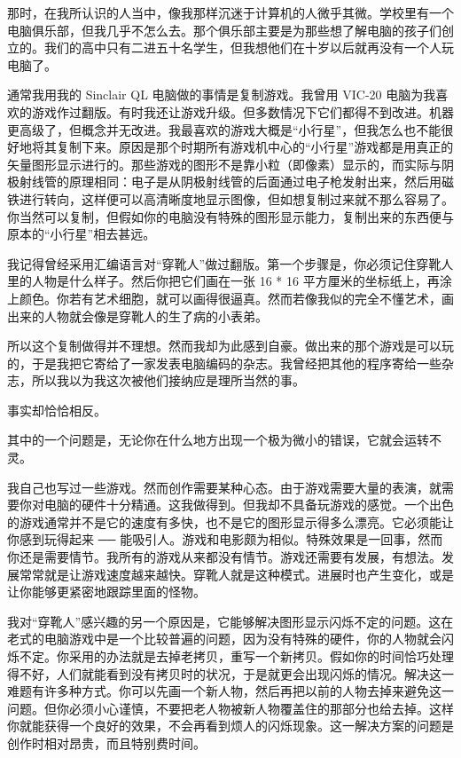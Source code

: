 那时，在我所认识的人当中，像我那样沉迷于计算机的人微乎其微。学校里有一个电脑俱乐部，但我几乎不怎么去。那个俱乐部主要是为那些想了解电脑的孩子们创立的。我们的高中只有二进五十名学生，但我想他们在十岁以后就再没有一个人玩电脑了。

通常我用我的 Sinclair QL 电脑做的事情是复制游戏。我曾用 VIC-20 电脑为我喜欢的游戏作过翻版。有时我还让游戏升级。但多数情况下它们都得不到改进。机器更高级了，但概念并无改进。我最喜欢的游戏大概是“小行星”，但我怎么也不能很好地将其复制下来。原因是那个时期所有游戏机中心的“小行星”游戏都是用真正的矢量图形显示进行的。那些游戏的图形不是靠小粒（即像素）显示的，而实际与阴极射线管的原理相同：电子是从阴极射线管的后面通过电子枪发射出来，然后用磁铁进行转向，这样便可以高清晰度地显示图像，但如想复制过来就不那么容易了。你当然可以复制，但假如你的电脑没有特殊的图形显示能力，复制出来的东西便与原本的“小行星”相去甚远。

我记得曾经采用汇编语言对“穿靴人”做过翻版。第一个步骤是，你必须记住穿靴人里的人物是什么样子。然后你把它们画在一张 16 * 16 平方厘米的坐标纸上，再涂上颜色。你若有艺术细胞，就可以画得很逼真。然而若像我似的完全不懂艺术，画出来的人物就会像是穿靴人的生了病的小表弟。

所以这个复制做得并不理想。然而我却为此感到自豪。做出来的那个游戏是可以玩的，于是我把它寄给了一家发表电脑编码的杂志。我曾经把其他的程序寄给一些杂志，所以我以为我这次被他们接纳应是理所当然的事。

事实却恰恰相反。

其中的一个问题是，无论你在什么地方出现一个极为微小的错误，它就会运转不灵。

我自己也写过一些游戏。然而创作需要某种心态。由于游戏需要大量的表演，就需要你对电脑的硬件十分精通。这我做得到。但我却不具备玩游戏的感觉。一个出色的游戏通常并不是它的速度有多快，也不是它的图形显示得多么漂亮。它必须能让你感到玩得起来 ── 能吸引人。游戏和电影颇为相似。特殊效果是一回事，然而你还是需要情节。我所有的游戏从来都没有情节。游戏还需要有发展，有想法。发展常常就是让游戏速度越来越快。穿靴人就是这种模式。进展时也产生变化，或是让你能够更紧密地跟踪里面的怪物。

我对“穿靴人”感兴趣的另一个原因是，它能够解决图形显示闪烁不定的问题。这在老式的电脑游戏中是一个比较普遍的问题，因为没有特殊的硬件，你的人物就会闪烁不定。你采用的办法就是去掉老拷贝，重写一个新拷贝。假如你的时间恰巧处理得不好，人们就能看到没有拷贝时的状况，于是就更会出现闪烁的情况。解决这一难题有许多种方式。你可以先画一个新人物，然后再把以前的人物去掉来避免这一问题。但你必须小心谨慎，不要把老人物被新人物覆盖住的那部分也给去掉。这样你就能获得一个良好的效果，不会再看到烦人的闪烁现象。这一解决方案的问题是创作时相对昂贵，而且特别费时间。

